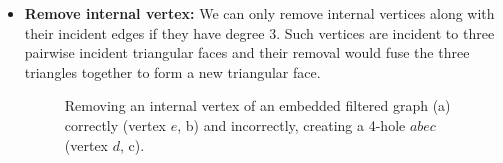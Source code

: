 \begin{itemize}
	\clearpage
	\item \textbf{Remove internal vertex:} We can only remove internal vertices along with their incident edges if they have degree 3. Such vertices are incident to three pairwise incident triangular faces and their removal would fuse the three triangles together to form a new triangular face.
\begin{figure}[H]
	\centering
	\quad
	\quad
	\caption{Removing an internal vertex of an embedded filtered graph (a) correctly (vertex $e$, b) and incorrectly, creating a 4-hole $abec$ (vertex $d$, c).}
	\label{fig:transformation}
\end{figure}


\end{itemize}
